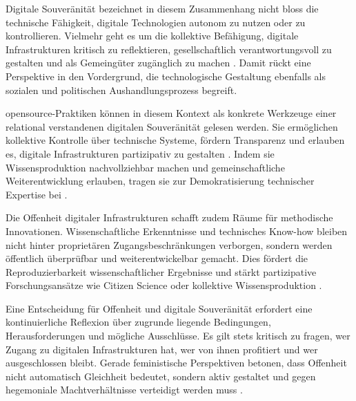 Digitale Souveränität bezeichnet in diesem Zusammenhang nicht bloss die technische Fähigkeit, digitale Technologien autonom zu nutzen oder zu kontrollieren. Vielmehr geht es um die kollektive Befähigung, digitale Infrastrukturen kritisch zu reflektieren, gesellschaftlich verantwortungsvoll zu gestalten und als Gemeingüter zugänglich zu machen \parencite{baackDataficationEmpowermentHow2015, glaszeContestedSpatialitiesDigital2023}. Damit rückt eine Perspektive in den Vordergrund, die technologische Gestaltung ebenfalls als sozialen und politischen Aushandlungsprozess begreift.

\gls{opensource}-Praktiken können in diesem Kontext als konkrete Werkzeuge einer relational verstandenen digitalen Souveränität gelesen werden. Sie ermöglichen kollektive Kontrolle über technische Systeme, fördern Transparenz und erlauben es, digitale Infrastrukturen partizipativ zu gestalten \parencite{gurumurthyDataBodiesNew2022}. Indem sie Wissensproduktion nachvollziehbar machen und gemeinschaftliche Weiterentwicklung erlauben, tragen sie zur Demokratisierung technischer Expertise bei \parencite{baackDataficationEmpowermentHow2015, pohleDigitalSovereignty2020}.

Die Offenheit digitaler Infrastrukturen schafft zudem Räume für methodische Innovationen. Wissenschaftliche Erkenntnisse und technisches Know-how bleiben nicht hinter proprietären Zugangsbeschränkungen verborgen, sondern werden öffentlich überprüfbar und weiterentwickelbar gemacht. Dies fördert die Reproduzierbarkeit wissenschaftlicher Ergebnisse und stärkt partizipative Forschungsansätze wie Citizen Science oder kollektive Wissensproduktion \parencite{fecherWhatDrivesAcademic2014}.

Eine Entscheidung für Offenheit und digitale Souveränität erfordert eine kontinuierliche Reflexion über zugrunde liegende Bedingungen, Herausforderungen und mögliche Ausschlüsse. Es gilt stets kritisch zu fragen, wer Zugang zu digitalen Infrastrukturen hat, wer von ihnen profitiert und wer ausgeschlossen bleibt. Gerade feministische Perspektiven betonen, dass Offenheit nicht automatisch Gleichheit bedeutet, sondern aktiv gestaltet und gegen hegemoniale Machtverhältnisse verteidigt werden muss \parencite{wilshireTimeRebootFeminism2024}.
